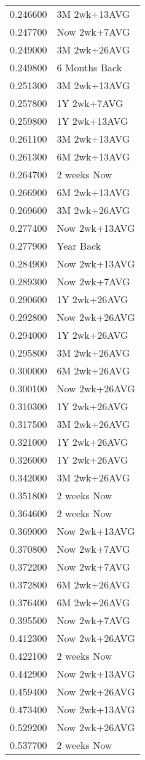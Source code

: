 \begin{tabular}{rl}
0.246600 & 3M 2wk+13AVG \\
0.247700 & Now 2wk+7AVG \\
0.249000 & 3M 2wk+26AVG \\
0.249800 & 6 Months Back \\
0.251300 & 3M 2wk+13AVG \\
0.257800 & 1Y 2wk+7AVG \\
0.259800 & 1Y 2wk+13AVG \\
0.261100 & 3M 2wk+13AVG \\
0.261300 & 6M 2wk+13AVG \\
0.264700 & 2 weeks Now \\
0.266900 & 6M 2wk+13AVG \\
0.269600 & 3M 2wk+26AVG \\
0.277400 & Now 2wk+13AVG \\
0.277900 & Year Back \\
0.284900 & Now 2wk+13AVG \\
0.289300 & Now 2wk+7AVG \\
0.290600 & 1Y 2wk+26AVG \\
0.292800 & Now 2wk+26AVG \\
0.294000 & 1Y 2wk+26AVG \\
0.295800 & 3M 2wk+26AVG \\
0.300000 & 6M 2wk+26AVG \\
0.300100 & Now 2wk+26AVG \\
0.310300 & 1Y 2wk+26AVG \\
0.317500 & 3M 2wk+26AVG \\
0.321000 & 1Y 2wk+26AVG \\
0.326000 & 1Y 2wk+26AVG \\
0.342000 & 3M 2wk+26AVG \\
0.351800 & 2 weeks Now \\
0.364600 & 2 weeks Now \\
0.369000 & Now 2wk+13AVG \\
0.370800 & Now 2wk+7AVG \\
0.372200 & Now 2wk+7AVG \\
0.372800 & 6M 2wk+26AVG \\
0.376400 & 6M 2wk+26AVG \\
0.395500 & Now 2wk+7AVG \\
0.412300 & Now 2wk+26AVG \\
0.422100 & 2 weeks Now \\
0.442900 & Now 2wk+13AVG \\
0.459400 & Now 2wk+26AVG \\
0.473400 & Now 2wk+13AVG \\
0.529200 & Now 2wk+26AVG \\
0.537700 & 2 weeks Now \\
\hline
\end{tabular}